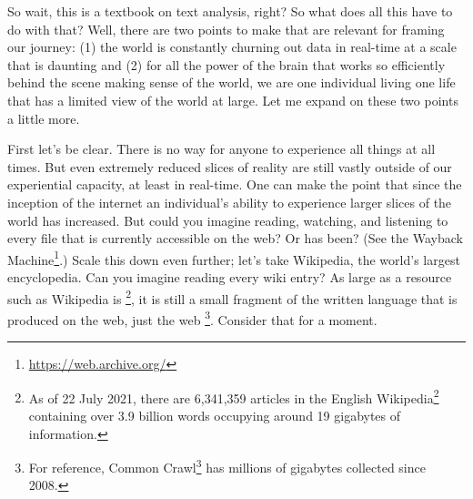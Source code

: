 \documentclass[
  letterpaper,
  DIV=11,
  numbers=noendperiod]{scrreport}
\theoremstyle{definition}
\theoremstyle{remark}
\DeclareRobustCommand{\href}[2]{#2\footnote{\url{#1}}}
\begin{document}
So wait, this is a textbook on text analysis, right? So what does all
this have to do with that? Well, there are two points to make that are
relevant for framing our journey: (1) the world is constantly churning
out data in real-time at a scale that is daunting and (2) for all the
power of the brain that works so efficiently behind the scene making
sense of the world, we are one individual living one life that has a
limited view of the world at large. Let me expand on these two points a
little more.

First let's be clear. There is no way for anyone to experience all
things at all times. But even extremely reduced slices of reality are
still vastly outside of our experiential capacity, at least in
real-time. One can make the point that since the inception of the
internet an individual's ability to experience larger slices of the
world has increased. But could you imagine reading, watching, and
listening to every file that is currently accessible on the web? Or has
been? (See the \href{https://web.archive.org/}{Wayback Machine}.) Scale
this down even further; let's take Wikipedia, the world's largest
encyclopedia. Can you imagine reading every wiki entry? As large as a
resource such as Wikipedia is \footnote{As of 22 July 2021, there are
  6,341,359 articles in the
  \href{https://en.wikipedia.org/wiki/English_Wikipedia}{English
  Wikipedia} containing over 3.9 billion words occupying around 19
  gigabytes of information.}, it is still a small fragment of the
written language that is produced on the web, just the web \footnote{For
  reference, \href{https://commoncrawl.org/big-picture/}{Common Crawl}
  has millions of gigabytes collected since 2008.}. Consider that for a
moment.
\end{document}
